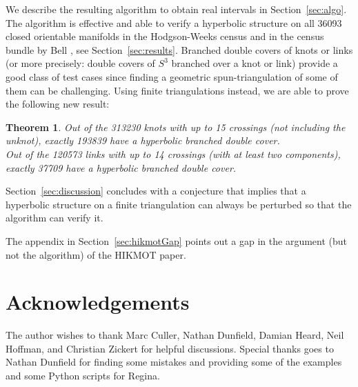 \documentclass[utopia,fullpage]{nmd/article}
\newtheorem{theorem}{Theorem}[section]
\begin{document}
We describe the resulting algorithm to obtain real intervals in Section~\ref{sec:algo}. The algorithm is effective and able to verify a hyperbolic structure on all 36093 closed orientable manifolds in the Hodgson-Weeks census \cite{hwcensus} and in the census bundle by Bell \cite{bellBundleCensus}, see Section~\ref{sec:results}. 
Branched double covers of knots or links (or more precisely: double covers of $S^3$ branched over a knot or link) provide a good class of test cases since finding a geometric spun-triangulation of some of them can be challenging. Using finite triangulations instead, we are able to prove the following new result:
\begin{theorem} \label{thm:hyperbolicBranchedDoubleCovers}
Out of the 313230 knots with up to 15 crossings (not including the unknot), exactly 193839 have a hyperbolic branched double cover.\\
Out of the 120573 links with up to 14 crossings (with at least two components), exactly 37709 have a hyperbolic branched double cover.
\end{theorem}

Section~\ref{sec:discussion} concludes with a conjecture that implies that a hyperbolic structure on a finite triangulation can always be perturbed so that the algorithm can verify it.

The appendix in Section~\ref{sec:hikmotGap} points out a gap in the argument (but not the algorithm) of the HIKMOT paper.

\section*{Acknowledgements}


The author wishes to thank Marc Culler, Nathan Dunfield, Damian Heard, Neil Hoffman, and Christian Zickert for helpful discussions. Special thanks goes to Nathan Dunfield for finding some mistakes and providing some of the examples and some Python scripts for Regina.

\end{document}
